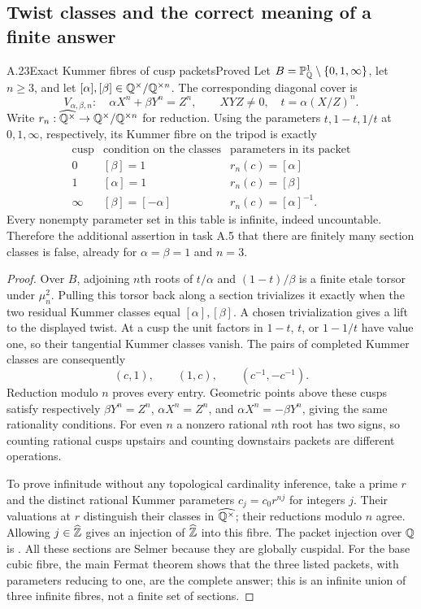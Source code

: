 \subsection{Twist classes and the correct meaning of a finite answer}

\begin{statement}{A.23}{Exact Kummer fibres of cusp packets}{Proved}
Let $B=\mathbb P^1_\mathbb Q\setminus\{0,1,\infty\}$, let $n\ge3$, and let $[\alpha],[\beta]\in\mathbb Q^\times/\mathbb Q^{\times n}$. The corresponding diagonal cover is
\[
V_{\alpha,\beta,n}:\quad \alpha X^n+\beta Y^n=Z^n,\qquad XYZ\ne0,
\quad t=\alpha(X/Z)^n.
\]
Write $r_n:\widehat{\mathbb Q^\times}\to\mathbb Q^\times/\mathbb Q^{\times n}$ for reduction. Using the parameters $t,1-t,1/t$ at $0,1,\infty$, respectively, its Kummer fibre on the tripod is exactly
\[
\begin{array}{c|c|c}
\text{cusp}&\text{condition on the classes}&\text{parameters in its packet}\\\hline
0&[\beta]=1&r_n(c)=[\alpha]\\
1&[\alpha]=1&r_n(c)=[\beta]\\
\infty&[\beta]=[-\alpha]&r_n(c)=[\alpha]^{-1}.
\end{array}
\]
Every nonempty parameter set in this table is infinite, indeed uncountable. Therefore the additional assertion in task A.5 that there are finitely many section classes is false, already for $\alpha=\beta=1$ and $n=3$.
\end{statement}
\begin{proof}
Over $B$, adjoining $n$th roots of $t/\alpha$ and $(1-t)/\beta$ is a finite etale torsor under $\mu_n^2$. Pulling this torsor back along a section trivializes it exactly when the two residual Kummer classes equal $[\alpha],[\beta]$. A chosen trivialization gives a lift to the displayed twist. At a cusp the unit factors in $1-t$, $t$, or $1-1/t$ have value one, so their tangential Kummer classes vanish. The pairs of completed Kummer classes are consequently
\[
(c,1),\qquad (1,c),\qquad(c^{-1},-c^{-1}).
\]
Reduction modulo $n$ proves every entry. Geometric points above these cusps satisfy respectively $\beta Y^n=Z^n$, $\alpha X^n=Z^n$, and $\alpha X^n=-\beta Y^n$, giving the same rationality conditions. For even $n$ a nonzero rational $n$th root has two signs, so counting rational cusps upstairs and counting downstairs packets are different operations.

To prove infinitude without any topological cardinality inference, take a prime $r$ and the distinct rational Kummer parameters $c_j=c_0r^{nj}$ for integers $j$. Their valuations at $r$ distinguish their classes in $\widehat{\mathbb Q^\times}$; their reductions modulo $n$ agree. Allowing $j\in\widehat{\mathbb Z}$ gives an injection of $\widehat{\mathbb Z}$ into this fibre. The packet injection over $\mathbb Q$ is \citet[Theorem 17]{StixCuspidal}. All these sections are Selmer because they are globally cuspidal. For the base cubic fibre, the main Fermat theorem shows that the three listed packets, with parameters reducing to one, are the complete answer; this is an infinite union of three infinite fibres, not a finite set of sections.
\end{proof}

